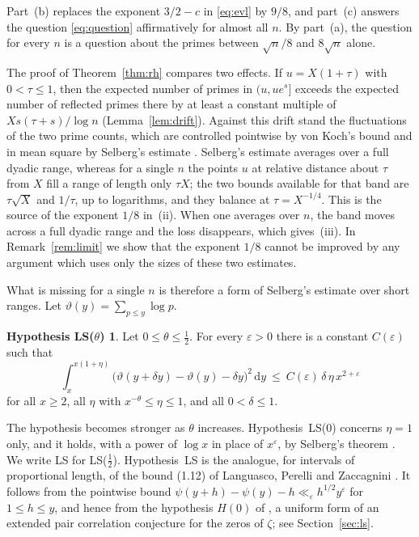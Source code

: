 \documentclass[11pt,reqno]{amsart}
\theoremstyle{definition}
\newtheorem*{hypothesis}{Hypothesis LS($\theta$)}
\theoremstyle{remark}
\numberwithin{equation}{section}
\newcommand{\dd}{\mathrm{d}}
\newcommand{\eps}{\varepsilon}
\begin{document}
Part~(b) replaces the exponent $3/2-c$ in \eqref{eq:evl} by $9/8$, and part~(c) answers the question \eqref{eq:question} affirmatively for almost all $n$. By part~(a), the question for every $n$ is a question about the primes between $\sqrt n/8$ and $8\sqrt n$ alone.

The proof of Theorem~\ref{thm:rh} compares two effects. If $u=X(1+\tau)$ with $0<\tau\le1$, then the expected number of primes in $(u,ue^s]$ exceeds the expected number of reflected primes there by at least a constant multiple of $Xs(\tau+s)/\log n$ (Lemma~\ref{lem:drift}). Against this drift stand the fluctuations of the two prime counts, which are controlled pointwise by von Koch's bound and in mean square by Selberg's estimate \cite{Se}. Selberg's estimate averages over a full dyadic range, whereas for a single $n$ the points $u$ at relative distance about $\tau$ from $X$ fill a range of length only $\tau X$; the two bounds available for that band are $\tau\sqrt X$ and $1/\tau$, up to logarithms, and they balance at $\tau=X^{-1/4}$. This is the source of the exponent $1/8$ in~(ii). When one averages over $n$, the band moves across a full dyadic range and the loss disappears, which gives~(iii). In Remark~\ref{rem:limit} we show that the exponent $1/8$ cannot be improved by any argument which uses only the sizes of these two estimates.

What is missing for a single $n$ is therefore a form of Selberg's estimate over short ranges. Let $\vartheta(y)=\sum_{p\le y}\log p$.

\begin{hypothesis}
Let $0\le\theta\le\frac12$. For every $\eps>0$ there is a constant $C(\eps)$ such that
\[
 \int_x^{x(1+\eta)}\bigl(\vartheta(y+\delta y)-\vartheta(y)-\delta y\bigr)^2\,\dd y\ \le\ C(\eps)\,\delta\,\eta\,x^{2+\eps}
\]
for all $x\ge2$, all $\eta$ with $x^{-\theta}\le\eta\le1$, and all $0<\delta\le1$.
\end{hypothesis}

The hypothesis becomes stronger as $\theta$ increases. Hypothesis~LS($0$) concerns $\eta=1$ only, and it holds, with a power of $\log x$ in place of $x^\eps$, by Selberg's theorem \cite{Se,SV,CHD}. We write LS for LS($\frac12$). Hypothesis~LS is the analogue, for intervals of proportional length, of the bound (1.12) of Languasco, Perelli and Zaccagnini \cite{LPZ}. It follows from the pointwise bound $\psi(y+h)-\psi(y)-h\ll_\eps h^{1/2}y^\eps$ for $1\le h\le y$, and hence from the hypothesis $H(0)$ of \cite{LPZ}, a uniform form of an extended pair correlation conjecture for the zeros of $\zeta$; see Section~\ref{sec:ls}.
\end{document}
